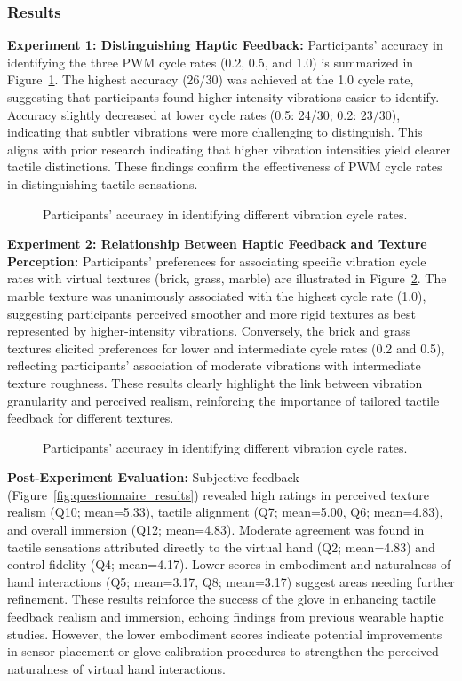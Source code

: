 \documentclass[graybox]{svmult}
\begin{document}
\subsubsection{Results}
\textbf{Experiment 1: Distinguishing Haptic Feedback: }
Participants' accuracy in identifying the three PWM cycle rates (0.2, 0.5, and 1.0) is summarized in Figure~\ref{fig:ex1_results}. The highest accuracy (26/30) was achieved at the 1.0 cycle rate, suggesting that participants found higher-intensity vibrations easier to identify. Accuracy slightly decreased at lower cycle rates (0.5: 24/30; 0.2: 23/30), indicating that subtler vibrations were more challenging to distinguish. This aligns with prior research indicating that higher vibration intensities yield clearer tactile distinctions. These findings confirm the effectiveness of PWM cycle rates in distinguishing tactile sensations.
\begin{figure}\centering
	
	\caption{Participants' accuracy in identifying different vibration cycle rates.}\label{fig:ex1_results}
\end{figure}

\textbf{Experiment 2: Relationship Between Haptic Feedback and Texture Perception: }
Participants' preferences for associating specific vibration cycle rates with virtual textures (brick, grass, marble) are illustrated in Figure~\ref{fig:ex2_results}. The marble texture was unanimously associated with the highest cycle rate (1.0), suggesting participants perceived smoother and more rigid textures as best represented by higher-intensity vibrations. Conversely, the brick and grass textures elicited preferences for lower and intermediate cycle rates (0.2 and 0.5), reflecting participants' association of moderate vibrations with intermediate texture roughness. These results clearly highlight the link between vibration granularity and perceived realism, reinforcing the importance of tailored tactile feedback for different textures.
\begin{figure}[H]
	\centering
	
	\caption{Participants' accuracy in identifying different vibration cycle rates.}\label{fig:ex2_results}
\end{figure}

\textbf{Post-Experiment Evaluation: }
Subjective feedback (Figure~\ref{fig:questionnaire_results}) revealed high ratings in perceived texture realism (Q10; mean=5.33), tactile alignment (Q7; mean=5.00, Q6; mean=4.83), and overall immersion (Q12; mean=4.83). Moderate agreement was found in tactile sensations attributed directly to the virtual hand (Q2; mean=4.83) and control fidelity (Q4; mean=4.17). Lower scores in embodiment and naturalness of hand interactions (Q5; mean=3.17, Q8; mean=3.17) suggest areas needing further refinement. These results reinforce the success of the glove in enhancing tactile feedback realism and immersion, echoing findings from previous wearable haptic studies. However, the lower embodiment scores indicate potential improvements in sensor placement or glove calibration procedures to strengthen the perceived naturalness of virtual hand interactions.
\end{document}
